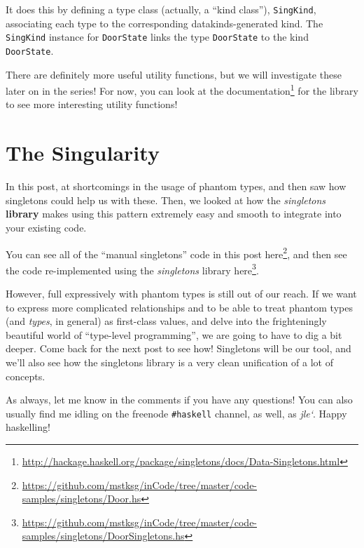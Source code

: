 \documentclass[]{article}
\renewcommand{\href}[2]{#2\footnote{\url{#1}}}
\begin{document}
It does this by defining a type class (actually, a ``kind class''),
\texttt{SingKind}, associating each type to the corresponding
datakinds-generated kind. The \texttt{SingKind} instance for \texttt{DoorState}
links the type \texttt{DoorState} to the kind \texttt{DoorState}.

There are definitely more useful utility functions, but we will investigate
these later on in the series! For now, you can look at the
\href{http://hackage.haskell.org/package/singletons/docs/Data-Singletons.html}{documentation}
for the library to see more interesting utility functions!

\section{The Singularity}\label{the-singularity}

In this post, at shortcomings in the usage of phantom types, and then saw how
singletons could help us with these. Then, we looked at how the
\emph{singletons} \textbf{library} makes using this pattern extremely easy and
smooth to integrate into your existing code.

You can see all of the ``manual singletons'' code in this post
\href{https://github.com/mstksg/inCode/tree/master/code-samples/singletons/Door.hs}{here},
and then see the code re-implemented using the \emph{singletons} library
\href{https://github.com/mstksg/inCode/tree/master/code-samples/singletons/DoorSingletons.hs}{here}.

However, full expressively with phantom types is still out of our reach. If we
want to express more complicated relationships and to be able to treat phantom
types (and \emph{types}, in general) as first-class values, and delve into the
frighteningly beautiful world of ``type-level programming'', we are going to
have to dig a bit deeper. Come back for the next post to see how! Singletons
will be our tool, and we'll also see how the singletons library is a very clean
unification of a lot of concepts.

As always, let me know in the comments if you have any questions! You can also
usually find me idling on the freenode \texttt{\#haskell} channel, as well, as
\emph{jle`}. Happy haskelling!
\end{document}
